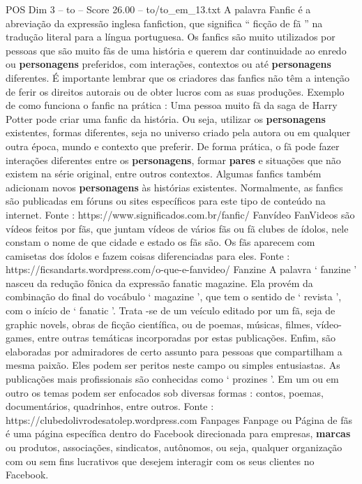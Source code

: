 \begin{textsample}{POS Dim 3 – to – Score 26.00 – to/to\_em\_13.txt}
A palavra Fanfic é a abreviação da expressão inglesa fanfiction, que significa “ ficção de fã ” na tradução literal para a língua portuguesa.
Os fanfics são muito utilizados por pessoas que são muito fãs de uma história e querem dar continuidade ao enredo ou \textbf{personagens} preferidos, com interações, contextos ou até \textbf{personagens} diferentes.
É importante lembrar que os criadores das fanfics não têm a intenção de ferir os direitos autorais ou de obter lucros com as suas produções.
Exemplo de como funciona o fanfic na prática : Uma pessoa muito fã da saga de Harry Potter pode criar uma fanfic da história.
Ou seja, utilizar os \textbf{personagens} existentes, formas diferentes, seja no universo criado pela autora ou em qualquer outra época, mundo e contexto que preferir.
De forma prática, o fã pode fazer interações diferentes entre os \textbf{personagens}, formar \textbf{pares} e situações que não existem na série original, entre outros contextos.
Algumas fanfics também adicionam novos \textbf{personagens} às histórias existentes.
Normalmente, as fanfics são publicadas em fóruns ou sites específicos para este tipo de conteúdo na internet.
Fonte : https://www.significados.com.br/fanfic/ Fanvídeo FanVideos são vídeos feitos por fãs, que juntam vídeos de vários fãs ou fã clubes de ídolos, nele constam o nome de que cidade e estado os fãs são.
Os fãs aparecem com camisetas dos ídolos e fazem coisas diferenciadas para eles.
Fonte : https://ficsandarts.wordpress.com/o-que-e-fanvideo/ Fanzine A palavra ‘ fanzine ’ nasceu da redução fônica da expressão fanatic magazine.
Ela provém da combinação do final do vocábulo ‘ magazine ’, que tem o sentido de ‘ revista ’, com o início de ‘ fanatic ’.
Trata -se de um veículo editado por um fã, seja de graphic novels, obras de ficção científica, ou de poemas, músicas, filmes, vídeo-games, entre outras temáticas incorporadas por estas publicações.
Enfim, são elaboradas por admiradores de certo assunto para pessoas que compartilham a mesma paixão.
Eles podem ser peritos neste campo ou simples entusiastas.
As publicações mais profissionais são conhecidas como ‘ prozines ’.
Em um ou em outro os temas podem ser enfocados sob diversas formas : contos, poemas, documentários, quadrinhos, entre outros.
Fonte : https://clubedolivrodesatolep.wordpress.com Fanpages Fanpage ou Página de fãs é uma página específica dentro do Facebook direcionada para empresas, \textbf{marcas} ou produtos, associações, sindicatos, autônomos, ou seja, qualquer organização com ou sem fins lucrativos que desejem interagir com os seus clientes no Facebook.

\end{textsample}

